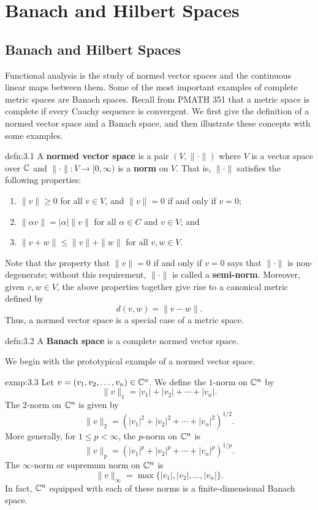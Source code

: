 \section{Banach and Hilbert Spaces}\label{sec:3}

\subsection{Banach and Hilbert Spaces}\label{subsec:3.1}
Functional analysis is the study of normed vector spaces and the continuous 
linear maps between them. Some of the most important examples of complete 
metric spaces are Banach spaces. Recall from PMATH 351 that a metric space is 
complete if every Cauchy sequence is convergent. We first give the definition 
of a normed vector space and a Banach space, and then illustrate these concepts 
with some examples. 

\begin{defn}{defn:3.1}
    A {\bf normed vector space} is a pair $(V, \|\cdot\|)$ where $V$ is a 
    vector space over $\mathbb{C}$ and $\|\cdot\| : V \to [0, \infty)$ is a 
    {\bf norm} on $V$. That is, $\|\cdot\|$ satisfies the following properties: 
    \begin{enumerate}[(1)]
        \item $\|v\| \geq 0$ for all $v \in V$, and $\|v\| = 0$ 
        if and only if $v = 0$; 
        \item $\|\alpha v\| = |\alpha|\|v\|$ for all $\alpha \in C$ and 
        $v \in V$; and 
        \item $\|v + w\| \leq \|v\| + \|w\|$ for all $v, w \in V$. 
    \end{enumerate}
\end{defn}

Note that the property that $\|v\| = 0$ if and only if $v = 0$ says that 
$\|\cdot\|$ is non-degenerate; without this requirement, $\|\cdot\|$ is 
called a {\bf semi-norm}. Moreover, given $v, w \in V$, the above properties 
together give rise to a canonical metric defined by 
\[ d(v, w) = \|v - w\|. \]
Thus, a normed vector space is a special case of a metric space. 

\begin{defn}{defn:3.2}
    A {\bf Banach space} is a complete normed vector space. 
\end{defn}

We begin with the prototypical example of a normed vector space. 

\begin{exmp}{exmp:3.3} 
    Let $v = (v_1, v_2, \dots, v_n) \in \mathbb{C}^n$. We define the $1$-norm on $\mathbb{C}^n$ by 
    \[ \|v\|_1 = |v_1| + |v_2| + \cdots + |v_n|. \] 
    The $2$-norm on $\mathbb{C}^n$ is given by 
    \[ \|v\|_2 = (|v_1|^2 + |v_2|^2 + \cdots + |v_n|^2)^{1/2}. \] 
    More generally, for $1 \leq p < \infty$, the $p$-norm on $\mathbb{C}^n$ is 
    \[ \|v\|_p = (|v_1|^p + |v_2|^p + \cdots + |v_n|^p)^{1/p}. \] 
    The $\infty$-norm or supremum norm on $\mathbb{C}^n$ is 
    \[ \|v\|_\infty = \max\{|v_1|, |v_2|, \dots, |v_n|\}. \] 
    In fact, $\mathbb{C}^n$ equipped with each of these norms is a finite-dimensional 
    Banach space. 
\end{exmp}

